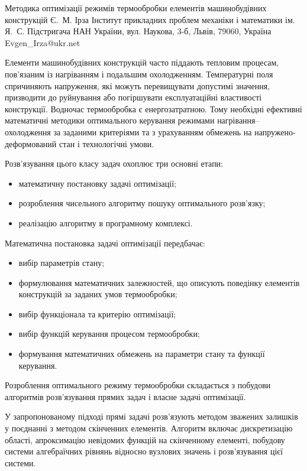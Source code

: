 \ReportHeading
  {Методика оптимізації режимів термообробки елементів машинобудівних конструкцій}
  {Є.~М. Ірза}
  {Інститут прикладних проблем механіки і математики ім. Я.~С. Підстригача НАН України, вул. Наукова, 3-б, Львів, 79060, Україна}
  {Evgen_Irza@ukr.net}

Елементи машинобудівних конструкцій часто піддають тепловим процесам, пов’язаним із нагріванням і подальшим охолодженням. Температурні поля спричиняють напруження, які можуть перевищувати допустимі значення, призводити до руйнування або погіршувати експлуатаційні властивості конструкції. Водночас термообробка є енергозатратною. Тому необхідні ефективні математичні методики оптимального керування режимами нагрівання--охолодження за заданими критеріями та з урахуванням обмежень на напружено-деформований стан і технологічні умови.

Розв’язування цього класу задач охоплює три основні етапи:
\begin{itemize}[nosep,leftmargin=2em]
  \item математичну постановку задачі оптимізації;
  \item розроблення чисельного алгоритму пошуку оптимального розв’язку;
  \item реалізацію алгоритму в програмному комплексі.
\end{itemize}

Математична постановка задачі оптимізації передбачає:
\begin{itemize}[nosep,leftmargin=2em]
  \item вибір параметрів стану;
  \item формулювання математичних залежностей, що описують поведінку елементів конструкцій за заданих умов термообробки;
  \item вибір функціонала та критерію оптимізації;
  \item вибір функцій керування процесом термообробки;
  \item формування математичних обмежень на параметри стану та функції керування.
\end{itemize}

Розроблення оптимального режиму термообробки складається з побудови алгоритмів розв’язування прямих задач і власне задачі оптимізації.

У запропонованому підході прямі задачі розв’язують методом зважених залишків у поєднанні з методом скінченних елементів. Алгоритм включає дискретизацію області, апроксимацію невідомих функцій на скінченному елементі, побудову системи алгебраїчних рівнянь відносно вузлових значень і розв’язування цієї системи.

